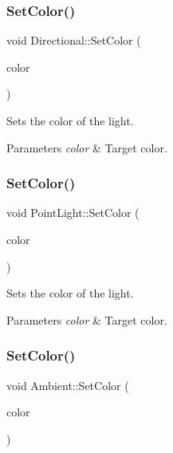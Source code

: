 \subsubsection{\texorpdfstring{Set\+Color()}{SetColor()}\hspace{0.1cm}{\footnotesize\ttfamily [1/3]}}
{\footnotesize\ttfamily void Directional\+::\+Set\+Color (\begin{DoxyParamCaption}\item[{const \hyperlink{class_r_g_b_color}{R\+G\+B\+Color} \&}]{color }\end{DoxyParamCaption})\hspace{0.3cm}{\ttfamily [inline]}}

Sets the color of the light. 
\begin{DoxyParams}{Parameters}
{\em color} & Target color. \\
\hline
\end{DoxyParams}
\hypertarget{group___lights_ga27c17e299711f7131091c714b837f619}{}\label{group___lights_ga27c17e299711f7131091c714b837f619} 
\subsubsection{\texorpdfstring{Set\+Color()}{SetColor()}\hspace{0.1cm}{\footnotesize\ttfamily [2/3]}}
{\footnotesize\ttfamily void Point\+Light\+::\+Set\+Color (\begin{DoxyParamCaption}\item[{const \hyperlink{class_r_g_b_color}{R\+G\+B\+Color} \&}]{color }\end{DoxyParamCaption})\hspace{0.3cm}{\ttfamily [inline]}}

Sets the color of the light. 
\begin{DoxyParams}{Parameters}
{\em color} & Target color. \\
\hline
\end{DoxyParams}
\hypertarget{group___lights_gaac238172e351af4e5b302b0a006bf719}{}\label{group___lights_gaac238172e351af4e5b302b0a006bf719} 
\subsubsection{\texorpdfstring{Set\+Color()}{SetColor()}\hspace{0.1cm}{\footnotesize\ttfamily [3/3]}}
{\footnotesize\ttfamily void Ambient\+::\+Set\+Color (\begin{DoxyParamCaption}\item[{const \hyperlink{class_r_g_b_color}{R\+G\+B\+Color} \&}]{color }\end{DoxyParamCaption})\hspace{0.3cm}{\ttfamily [inline]}}

